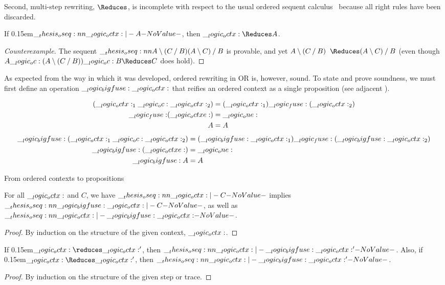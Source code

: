 Second, multi-step rewriting, $\Reduces$, is incomplete with respect to the usual ordered sequent calculus~ because all right rules have been discarded.%
%
 \begin{falseclaim}[Completeness]
  If \kern0.15em$\oseq{\octx |- A}$, then\/ $\octx \Reduces A$.
\end{falseclaim}
%
\begin{proof}[Counterexample]
  The sequent $\oseq{A \limp (C \pmir B) |- (A \limp C) \pmir B}$ is provable, and yet $A \limp (C \pmir B) \Longarrownot\Reduces (A \limp C) \pmir B$ (even though $A \oc (A \limp (C \pmir B)) \oc B \Reduces C$ does hold).
\end{proof}
\noindent
As expected from the way in which it was developed, ordered rewriting in \acs{OR} is, however, sound.
To state and prove soundness, we must first define an operation $\__logic_bigfuse: \__logic_octx:$ that reifies an ordered context as a single proposition (see adjacent ).%
%
\begin{marginfigure}
  \begin{align*}
    (\__logic_octx:_1 \__logic_oc: \__logic_octx:_2) &= (\__logic_octx:_1) \__logic_fuse: (\__logic_octx:_2) \\
    \mathord{\text{$\__logic_fuse:$}} (\__logic_octxe:) &= \__logic_one: \\
    A &= A
  \end{align*}
  \begin{align*}
    \__logic_bigfuse: (\__logic_octx:_1 \__logic_oc: \__logic_octx:_2) &= (\__logic_bigfuse: \__logic_octx:_1) \__logic_fuse: (\__logic_bigfuse: \__logic_octx:_2) \\
    \__logic_bigfuse: (\__logic_octxe:) &= \__logic_one: \\
    \__logic_bigfuse: A &= A
  \end{align*}
  \caption{From ordered contexts to propositions}\label{fig:ordered-rewriting:bigfuse}
\end{marginfigure}%
%
\begin{lemma}
  For all $\__logic_octx:$ and $C$, we have $\oseq{\octx |- C}$ implies $\oseq{\bigfuse \octx |- C}$, as well as $\oseq{\octx |- \bigfuse \octx}$.
\end{lemma}
\begin{proof}
  By induction on the structure of the given context, $\__logic_octx:$.
\end{proof}
%
\begin{theorem}[Soundness]
  If \kern0.15em$\octx \reduces \octx'$, then\/ $\oseq{\octx |- \bigfuse \octx'}$.
  Also, if \kern0.15em$\octx \Reduces \octx'$, then\/ $\oseq{\octx |- \bigfuse \octx'}$.
\end{theorem}
%
\begin{proof}
  By induction on the structure of the given step or trace.
\end{proof}

